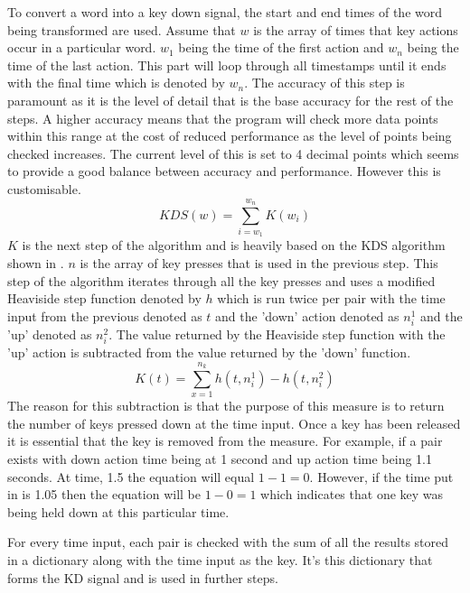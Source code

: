 \documentclass[10pt,a4paper]{report}
\begin{document}
To convert a word into a key down signal, the start and end times of the word being transformed are used. Assume that \(w\) is the array of times that key actions occur in a particular word. \(w_1\) being the time of the first action and \(w_n\) being the time of the last action. This part will loop through all timestamps until it ends with the final time which is denoted by \(w_n\). The accuracy of this step is paramount as it is the level of detail that is the base accuracy for the rest of the steps. A higher accuracy means that the program will check more data points within this range at the cost of reduced performance as the level of points being checked increases. The current level of this is set to 4 decimal points which seems to provide a good balance between accuracy and performance. However this is customisable.
\begin{equation}
\textit{KDS}(w) = \sum^{w_n}_{i=w_1}K(w_i)
\end{equation}
\(K\) is the next step of the algorithm and is heavily based on the KDS algorithm shown in \cite{ToosiRamin2021Taok}. \(n\) is the array of key presses that is used in the previous step. This step of the algorithm iterates through all the key presses and uses a modified Heaviside step function denoted by \(h\) which is run twice per pair with the time input from the previous denoted as \(t\) and the 'down' action denoted as \(n_i^1\) and the 'up' denoted as \(n_i^2\). The value returned by the Heaviside step function with the 'up' action is subtracted from the value returned by the 'down' function.
\begin{equation}
\textit{K}(t) = \sum^{n_k}_{x=1}h(t,n_i^1)-h(t,n_i^2)
\end{equation}
The reason for this subtraction is that the purpose of this measure is to return the number of keys pressed down at the time input. Once a key has been released it is essential that the key is removed from the measure. For example, if a pair exists with down action time being at 1 second and up action time being 1.1 seconds. At time, 1.5 the equation will equal \(1-1=0\). However, if the time put in is 1.05 then the equation will be \(1-0=1\) which indicates that one key was being held down at this particular time.

For every time input, each pair is checked with the sum of all the results stored in a dictionary along with the time input as the key. It's this dictionary that forms the KD signal and is used in further steps.
\end{document}
